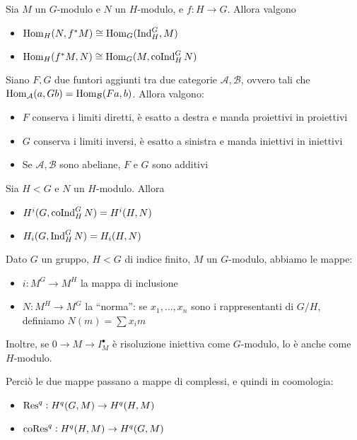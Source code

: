 \begin{proposition}
    Sia $M$ un $G$-modulo e $N$ un $H$-modulo, e $f:H\to G$. Allora valgono
    \begin{itemize}
        \item $\operatorname{Hom}_H(N,f^\ast M)\cong\operatorname{Hom}_G(\operatorname{Ind}_H^G,M)$
        \item $\operatorname{Hom}_H(f^\ast M, N)\cong\operatorname{Hom}_G(M,\operatorname{coInd}_H^G N)$
    \end{itemize}
\end{proposition}

\begin{proposition}
    Siano $F,G$ due funtori aggiunti tra due categorie $\mathcal A,\mathcal B$, ovvero tali che $\operatorname{Hom}_{\mathcal A}(a,Gb)=\operatorname{Hom}_{\mathcal B}(Fa,b)$. Allora valgono:
    \begin{itemize}
        \item $F$ conserva i limiti diretti, è esatto a destra e manda proiettivi in proiettivi
        \item $G$ conserva i limiti inversi, è esatto a sinistra e manda iniettivi in iniettivi
        \item Se $\mathcal A,\mathcal B$ sono abeliane, $F$ e $G$ sono additivi
    \end{itemize}
\end{proposition}

\begin{theorem}
    Sia $H<G$ e $N$ un $H$-modulo. Allora
    \begin{itemize}
        \item $H^i(G,\operatorname{coInd}_H^G N)=H^i(H,N)$
        \item $H_i(G,\operatorname{Ind}_H^G N)=H_i(H,N)$
    \end{itemize}
\end{theorem}

\begin{definition}
    Dato $G$ un gruppo, $H<G$ di indice finito, $M$ un $G$-modulo, abbiamo le mappe:
    \begin{itemize}
        \item $i:M^G\to M^H$ la mappa di inclusione
        \item $N:M^H\to M^G$ la ``norma'': se $x_1,\dots,x_n$ sono i rappresentanti di $G/H$, definiamo $N(m)=\sum x_im$
    \end{itemize}
    Inoltre, se $0\to M\to I_M^\bullet$ è risoluzione iniettiva come $G$-modulo, lo è anche come $H$-modulo.
    
    Perciò le due mappe passano a mappe di complessi, e quindi in coomologia:
    \begin{itemize}
        \item $\operatorname{Res}^q:H^q(G,M)\to H^q(H,M)$
        \item $\operatorname{coRes}^q:H^q(H,M)\to H^q(G,M)$
    \end{itemize}
\end{definition}

